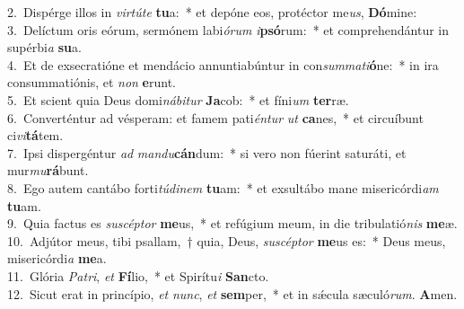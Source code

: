 {2.~}Dispérge illos in \textit{vir}\textit{tú}\textit{te} \textbf{tu}a:~* et depóne eos, protéctor me\textit{us}, \textbf{Dó}mine:\\
{3.~}Delíctum oris eórum, sermónem labi\textit{ó}\textit{rum} \textit{i}\textbf{psó}rum:~* et comprehendántur in supérbi\textit{a} \textbf{su}a.\\
{4.~}Et de exsecratióne et mendácio annuntiabúntur in con\textit{sum}\textit{ma}\textit{ti}\textbf{ó}ne:~* in ira consummatiónis, et \textit{non} \textbf{e}runt.\\
{5.~}Et scient quia Deus domi\textit{ná}\textit{bi}\textit{tur} \textbf{Ja}cob:~* et fíni\textit{um} \textbf{ter}ræ.\\
{6.~}Converténtur ad vésperam: et famem pati\textit{én}\textit{tur} \textit{ut} \textbf{ca}nes,~* et circuíbunt ci\textit{vi}\textbf{tá}tem.\\
{7.~}Ipsi dispergéntur \textit{ad} \textit{man}\textit{du}\textbf{cán}dum:~* si vero non fúerint saturáti, et mur\textit{mu}\textbf{rá}bunt.\\
{8.~}Ego autem cantábo forti\textit{tú}\textit{di}\textit{nem} \textbf{tu}am:~* et exsultábo mane misericórdi\textit{am} \textbf{tu}am.\\
{9.~}Quia factus es \textit{su}\textit{scép}\textit{tor} \textbf{me}us,~* et refúgium meum, in die tribulatió\textit{nis} \textbf{me}æ.\\
{10.~}Adjútor meus, tibi psallam,~† quia, Deus, \textit{su}\textit{scép}\textit{tor} \textbf{me}us es:~* Deus meus, misericórdi\textit{a} \textbf{me}a.\\
{11.~}Glória \textit{Pa}\textit{tri}, \textit{et} \textbf{Fí}lio,~* et Spirítu\textit{i} \textbf{San}cto.\\
{12.~}Sicut erat in princípio, \textit{et} \textit{nunc}, \textit{et} \textbf{sem}per,~* et in sǽcula sæculó\textit{rum}. \textbf{A}men.\\

